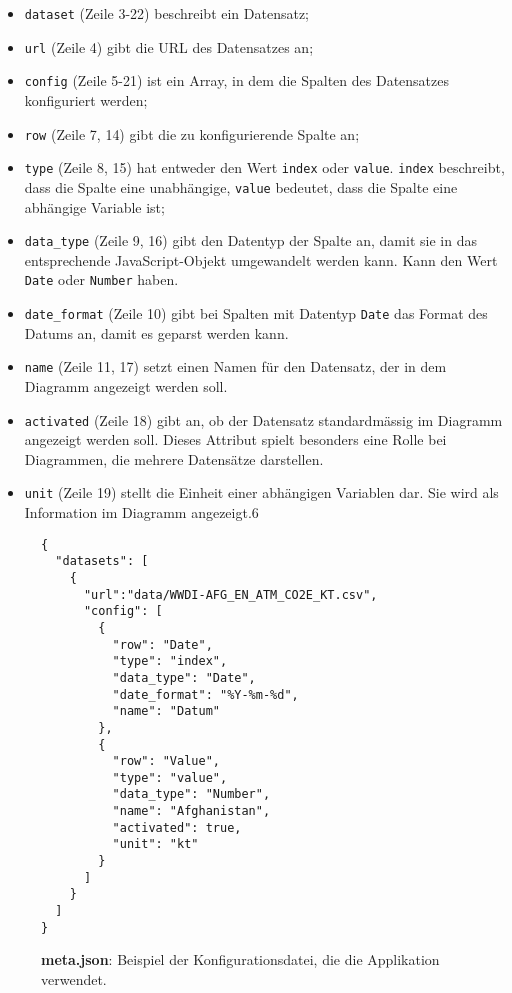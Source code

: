 \begin{itemize}
	\item \texttt{dataset} (Zeile 3-22) beschreibt ein Datensatz;
	\item \texttt{url} (Zeile 4) gibt die URL des Datensatzes an;
	\item \texttt{config} (Zeile 5-21) ist ein Array, in dem die Spalten des Datensatzes konfiguriert werden;
	\item \texttt{row} (Zeile 7, 14) gibt die zu konfigurierende Spalte an;
	\item \texttt{type} (Zeile 8, 15) hat entweder den Wert \texttt{index} oder \texttt{value}. \texttt{index}  beschreibt, dass die Spalte eine unabhängige, \texttt{value} bedeutet, dass die Spalte eine abhängige Variable ist;
	\item \texttt{data\_type} (Zeile 9, 16) gibt den Datentyp der Spalte an, damit sie in das entsprechende JavaScript-Objekt umgewandelt werden kann. Kann den Wert \texttt{Date} oder \texttt{Number} haben.
	\item \texttt{date\_format} (Zeile 10) gibt bei Spalten mit Datentyp \texttt{Date} das Format des Datums an, damit es geparst werden kann.
	\item \texttt{name} (Zeile 11, 17) setzt einen Namen für den Datensatz, der in dem Diagramm angezeigt werden soll.
	\item \texttt{activated} (Zeile 18) gibt an, ob der Datensatz standardmässig im Diagramm angezeigt werden soll. Dieses Attribut spielt besonders eine Rolle bei Diagrammen, die mehrere Datensätze darstellen.
	\item \texttt{unit} (Zeile 19) stellt die Einheit einer abhängigen Variablen dar. Sie wird als Information im Diagramm angezeigt.6
\end{itemize}




\begin{figure}[!htbp]
	\centering
	\begin{verbatim}
{
  "datasets": [
    {
      "url":"data/WWDI-AFG_EN_ATM_CO2E_KT.csv",
      "config": [
        {
          "row": "Date",
          "type": "index",
          "data_type": "Date",
          "date_format": "%Y-%m-%d",
          "name": "Datum"
        },
        {
          "row": "Value",
          "type": "value",
          "data_type": "Number",
          "name": "Afghanistan",
          "activated": true,
          "unit": "kt"
        }
      ]
    }
  ]	
}
	\end{verbatim}
	
	
	\caption[Beispiel der Konfigurationsdatei: meta.json]{\textbf{meta.json}: Beispiel der Konfigurationsdatei, die die Applikation verwendet.}
	\label{fig:meta}
\end{figure}

